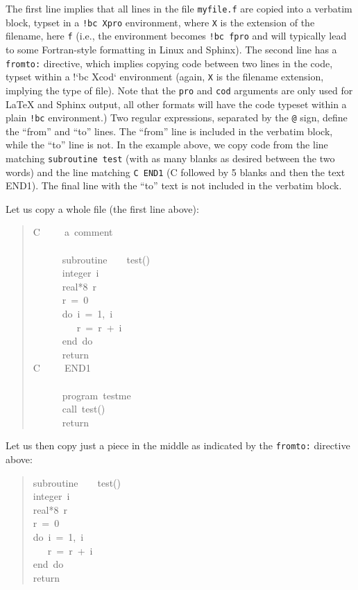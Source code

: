 \documentclass[a4paper]{article}
\begin{document}
The first line implies that all lines in the file \texttt{myfile.f} are
copied into a verbatim block, typset in a \texttt{!bc Xpro} environment, where
\texttt{X} is the extension of the filename, here \texttt{f} (i.e., the environment
becomes \texttt{!bc fpro} and will typically lead to some Fortran-style
formatting in Linux and Sphinx).  The
second line has a \texttt{fromto:} directive, which implies copying code
between two lines in the code, typset within a !`bc Xcod`
environment (again, \texttt{X} is the filename extension, implying the
type of file). Note that the \texttt{pro} and \texttt{cod} arguments are only used for LaTeX
and Sphinx output, all other formats will have the code typeset within
a plain \texttt{!bc} environment.) Two regular expressions, separated by the
\texttt{@} sign, define the ``from'' and ``to'' lines.  The ``from'' line is
included in the verbatim block, while the ``to'' line is not. In the
example above, we copy code from the line matching \texttt{subroutine test}
(with as many blanks as desired between the two words) and the line
matching \texttt{C END1} (C followed by 5 blanks and then the text END1). The
final line with the ``to'' text is not included in the verbatim block.

Let us copy a whole file (the first line above):
%
\begin{quote}{\ttfamily \raggedright \noindent
C~~~~~a~comment\\
~\\
~~~~~~subroutine~~~~test()\\
~~~~~~integer~i\\
~~~~~~real*8~r\\
~~~~~~r~=~0\\
~~~~~~do~i~=~1,~i\\
~~~~~~~~~r~=~r~+~i\\
~~~~~~end~do\\
~~~~~~return\\
C~~~~~END1\\
~\\
~~~~~~program~testme\\
~~~~~~call~test()\\
~~~~~~return
}
\end{quote}

Let us then copy just a piece in the middle as indicated by the \texttt{fromto:}
directive above:
%
\begin{quote}{\ttfamily \raggedright \noindent
subroutine~~~~test()\\
integer~i\\
real*8~r\\
r~=~0\\
do~i~=~1,~i\\
~~~r~=~r~+~i\\
end~do\\
return
}
\end{quote}
\end{document}
